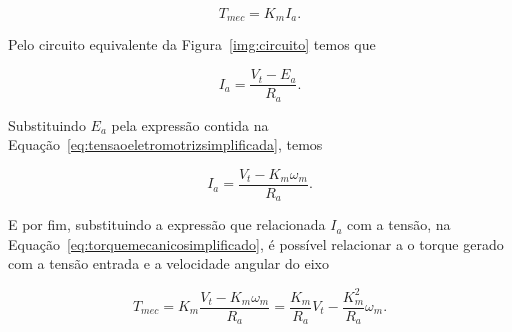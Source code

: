 		\begin{equation}
		    T_{mec} = K_m I_a.
		    \label{eq:torquemecanicosimplificado}
		\end{equation}
		
		Pelo circuito equivalente da Figura~\ref{img:circuito} temos que
		
		\begin{equation}
		    I_a = \frac{V_t - E_a}{R_a}.
		\end{equation}
		
		Substituindo $E_a$ pela expressão contida na Equação~\eqref{eq:tensaoeletromotrizsimplificada}, temos
		
		\begin{equation}
		    I_a = \frac{V_t - K_m \omega_m}{R_a}.
		\end{equation}
		
		E por fim, substituindo a expressão que relacionada $I_a$ com a tensão, na Equação~\eqref{eq:torquemecanicosimplificado}, é possível relacionar a o torque gerado com a tensão entrada e a velocidade angular do eixo
		
		\begin{equation}
		    T_{mec} = K_m \frac{V_t - K_m \omega_m}{R_a} = \frac{K_m}{R_a}V_t - \frac{K_m^2}{R_a}\omega_m.
		    \label{eq:torquemotor}
		\end{equation}
	    
